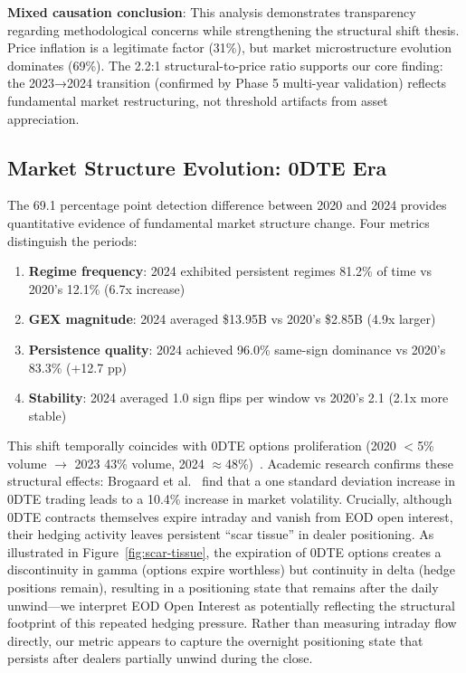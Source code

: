 \vspace{0.2cm}

\noindent\textbf{Mixed causation conclusion}: This analysis demonstrates transparency regarding methodological concerns while strengthening the structural shift thesis. Price inflation is a legitimate factor (31\%), but market microstructure evolution dominates (69\%). The 2.2:1 structural-to-price ratio supports our core finding: the 2023→2024 transition (confirmed by Phase 5 multi-year validation) reflects fundamental market restructuring, not threshold artifacts from asset appreciation.

\subsection{Market Structure Evolution: 0DTE Era}

\vspace{0.2cm}

The 69.1 percentage point detection difference between 2020 and 2024 provides quantitative evidence of fundamental market structure change. Four metrics distinguish the periods:

\vspace{0.1cm}

\begin{enumerate}
\item \textbf{Regime frequency}: 2024 exhibited persistent regimes 81.2\% of time vs 2020's 12.1\% (6.7x increase)
\item \textbf{GEX magnitude}: 2024 averaged \$13.95B vs 2020's \$2.85B (4.9x larger)
\item \textbf{Persistence quality}: 2024 achieved 96.0\% same-sign dominance vs 2020's 83.3\% (+12.7 pp)
\item \textbf{Stability}: 2024 averaged 1.0 sign flips per window vs 2020's 2.1 (2.1x more stable)
\end{enumerate}

\vspace{0.2cm}

This shift temporally coincides with 0DTE options proliferation (2020 $<$5\% volume $\rightarrow$ 2023 43\% volume, 2024 $\approx$48\%)~\cite{cboe2024zero}. Academic research confirms these structural effects: Brogaard et al.~\cite{brogaard2023does} find that a one standard deviation increase in 0DTE trading leads to a 10.4\% increase in market volatility. Crucially, although 0DTE contracts themselves expire intraday and vanish from EOD open interest, their hedging activity leaves persistent ``scar tissue'' in dealer positioning. As illustrated in Figure~\ref{fig:scar-tissue}, the expiration of 0DTE options creates a discontinuity in gamma (options expire worthless) but continuity in delta (hedge positions remain), resulting in a positioning state that remains after the daily unwind---we interpret EOD Open Interest as potentially reflecting the structural footprint of this repeated hedging pressure. Rather than measuring intraday flow directly, our metric appears to capture the overnight positioning state that persists after dealers partially unwind during the close.

